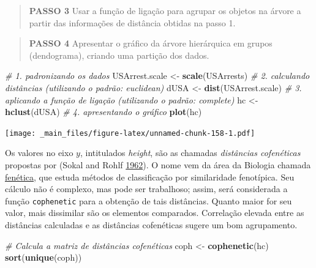\documentclass[
]{book}
\newenvironment{Shaded}{\begin{snugshade}}{\end{snugshade}}
\newcommand{\CommentTok}[1]{\textcolor[rgb]{0.56,0.35,0.01}{\textit{#1}}}
\newcommand{\KeywordTok}[1]{\textcolor[rgb]{0.13,0.29,0.53}{\textbf{#1}}}
\newcommand{\NormalTok}[1]{#1}
\newcommand{\StringTok}[1]{\textcolor[rgb]{0.31,0.60,0.02}{#1}}
\theoremstyle{definition}
\theoremstyle{definition}
\theoremstyle{definition}
\theoremstyle{remark}
\begin{document}
\begin{quote}
\textbf{PASSO 3} Usar a função de ligação para agrupar os objetos na árvore a partir das informações de distância obtidas na passo 1.
\end{quote}

\begin{quote}
\textbf{PASSO 4} Apresentar o gráfico da árvore hierárquica em grupos (dendograma), criando uma partição dos dados.
\end{quote}

\begin{Shaded}
\begin{Highlighting}[]
\CommentTok{\# 1. padronizando os dados}
\NormalTok{USArrest.scale \textless{}{-}}\StringTok{ }\KeywordTok{scale}\NormalTok{(USArrests)}
\CommentTok{\# 2. calculando distâncias (utilizando o padrão: euclidean)}
\NormalTok{dUSA \textless{}{-}}\StringTok{ }\KeywordTok{dist}\NormalTok{(USArrest.scale)}
\CommentTok{\# 3. aplicando a função de ligação (utilizando o padrão: complete)}
\NormalTok{hc \textless{}{-}}\StringTok{ }\KeywordTok{hclust}\NormalTok{(dUSA)}
\CommentTok{\# 4. apresentando o gráfico}
\KeywordTok{plot}\NormalTok{(hc)}
\end{Highlighting}
\end{Shaded}

\texttt{[image: \_main\_files/figure-latex/unnamed-chunk-158-1.pdf]}

Os valores no eixo \(y\), intitulados \emph{height}, são as chamadas \emph{distâncias cofenéticas} propostas por (Sokal and Rohlf \protect\hyperlink{ref-sokal1962comparison}{1962}). O nome vem da área da Biologia chamada \href{https://pt.wikipedia.org/wiki/Fen\%C3\%A9tica}{fenética}, que estuda métodos de classificação por similaridade fenotípica. Seu cálculo não é complexo, mas pode ser trabalhoso; assim, será considerada a função \texttt{cophenetic} para a obtenção de tais distâncias. Quanto maior for seu valor, mais dissimilar são os elementos comparados. Correlação elevada entre as distâncias calculadas e as distâncias cofenéticas sugere um bom agrupamento.

\begin{Shaded}
\begin{Highlighting}[]
\CommentTok{\# Calcula a matriz de distâncias cofenéticas}
\NormalTok{coph \textless{}{-}}\StringTok{ }\KeywordTok{cophenetic}\NormalTok{(hc)}
\KeywordTok{sort}\NormalTok{(}\KeywordTok{unique}\NormalTok{(coph))}
\end{Highlighting}
\end{Shaded}
\end{document}

